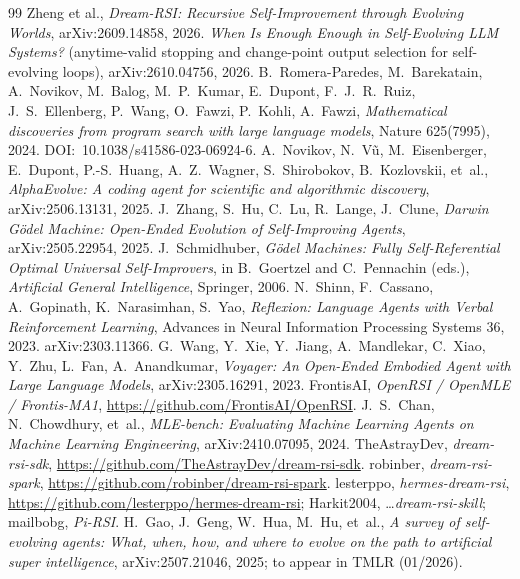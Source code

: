\documentclass[11pt,a4paper]{article}
\begin{document}
\begin{thebibliography}{99}
 Zheng et al., \emph{Dream-RSI: Recursive
Self-Improvement through Evolving Worlds}, arXiv:2609.14858, 2026.
 \emph{When Is Enough Enough in Self-Evolving LLM
Systems?} (anytime-valid stopping and change-point output selection for
self-evolving loops), arXiv:2610.04756, 2026.
 B.~Romera-Paredes, M.~Barekatain, A.~Novikov, M.~Balog,
M.~P.~Kumar, E.~Dupont, F.~J.~R.~Ruiz, J.~S.~Ellenberg, P.~Wang, O.~Fawzi,
P.~Kohli, A.~Fawzi, \emph{Mathematical discoveries from program search with
large language models}, Nature 625(7995), 2024.
DOI:~10.1038/s41586-023-06924-6.
 A.~Novikov, N.~V\~u, M.~Eisenberger, E.~Dupont,
P.-S.~Huang, A.~Z.~Wagner, S.~Shirobokov, B.~Kozlovskii, et~al.,
\emph{AlphaEvolve: A coding agent for scientific and algorithmic discovery},
arXiv:2506.13131, 2025.
 J.~Zhang, S.~Hu, C.~Lu, R.~Lange, J.~Clune, \emph{Darwin
G\"odel Machine: Open-Ended Evolution of Self-Improving Agents},
arXiv:2505.22954, 2025.
 J.~Schmidhuber, \emph{G\"odel Machines: Fully
Self-Referential Optimal Universal Self-Improvers}, in B.~Goertzel and
C.~Pennachin (eds.), \emph{Artificial General Intelligence}, Springer, 2006.
 N.~Shinn, F.~Cassano, A.~Gopinath, K.~Narasimhan,
S.~Yao, \emph{Reflexion: Language Agents with Verbal Reinforcement
Learning}, Advances in Neural Information Processing Systems 36, 2023.
arXiv:2303.11366.
 G.~Wang, Y.~Xie, Y.~Jiang, A.~Mandlekar, C.~Xiao, Y.~Zhu,
L.~Fan, A.~Anandkumar, \emph{Voyager: An Open-Ended Embodied Agent with
Large Language Models}, arXiv:2305.16291, 2023.
 FrontisAI, \emph{OpenRSI / OpenMLE / Frontis-MA1},
\url{https://github.com/FrontisAI/OpenRSI}.
 J.~S.~Chan, N.~Chowdhury, et~al., \emph{MLE-bench:
Evaluating Machine Learning Agents on Machine Learning Engineering},
arXiv:2410.07095, 2024.
 TheAstrayDev, \emph{dream-rsi-sdk},
\url{https://github.com/TheAstrayDev/dream-rsi-sdk}.
 robinber, \emph{dream-rsi-spark},
\url{https://github.com/robinber/dream-rsi-spark}.
 lesterppo, \emph{hermes-dream-rsi},
\url{https://github.com/lesterppo/hermes-dream-rsi}; Harkit2004,
\dots \emph{dream-rsi-skill}; mailbobg, \emph{Pi-RSI}.
 H.~Gao, J.~Geng, W.~Hua, M.~Hu, et~al.,
\emph{A survey of self-evolving agents: What, when, how, and where to evolve
on the path to artificial super intelligence}, arXiv:2507.21046, 2025;
to appear in TMLR (01/2026).

\end{thebibliography}
\end{document}
